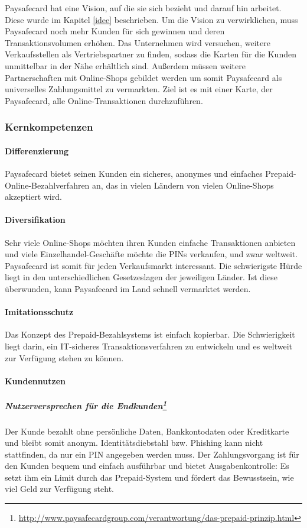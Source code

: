 Paysafecard hat eine Vision, auf die sie sich bezieht und darauf hin arbeitet. Diese wurde im Kapitel \ref{idee} beschrieben. Um die Vision zu verwirklichen, muss Paysafecard noch mehr Kunden für sich gewinnen und deren Transaktionsvolumen erhöhen. Das Unternehmen wird versuchen, weitere Verkaufsstellen als Vertriebspartner zu finden, sodass die Karten für die Kunden unmittelbar in der Nähe erhältlich sind. Außerdem müssen weitere Partnerschaften mit Online-Shops gebildet werden um somit Paysafecard als universelles Zahlungsmittel zu vermarkten. Ziel ist es mit einer Karte, der Paysafecard, alle Online-Transaktionen durchzuführen.


\subsubsection{Kernkompetenzen}

\paragraph{Differenzierung}
Paysafecard bietet seinen Kunden ein sicheres, anonymes und einfaches Prepaid-Online-Bezahlverfahren an, das in vielen Ländern von vielen Online-Shops akzeptiert wird.


\paragraph{Diversifikation}
Sehr viele Online-Shops möchten ihren Kunden einfache Transaktionen anbieten und viele Einzelhandel-Geschäfte möchte die PINs verkaufen, und zwar weltweit. Paysafecard ist somit für jeden Verkaufsmarkt interessant. Die schwierigste Hürde liegt in den unterschiedlichen Gesetzeslagen der jeweiligen Länder. Ist diese überwunden, kann Paysafecard im Land schnell vermarktet werden.

\paragraph{Imitationsschutz}
Das Konzept des Prepaid-Bezahlsystems ist einfach kopierbar. Die Schwierigkeit liegt darin, ein IT-sicheres Transaktionsverfahren zu entwickeln und es weltweit zur Verfügung stehen zu können.

\paragraph{Kundennutzen}
\subparagraph[Nutzerversprechen]{Nutzerversprechen für die Endkunden\footnote{\url{ http://www.paysafecardgroup.com/verantwortung/das-prepaid-prinzip.html}}}
Der Kunde bezahlt ohne persönliche Daten, Bankkontodaten oder Kreditkarte und bleibt somit ano\-nym. Identitätsdiebstahl bzw. Phishing kann nicht stattfinden, da nur ein PIN angegeben werden muss. Der Zahlungsvorgang ist für den Kunden bequem und einfach ausführbar und bietet Ausgabenkontrolle: Es setzt ihm ein Limit durch das Prepaid-System und fördert das Bewusstsein, wie viel Geld zur Verfügung steht.


